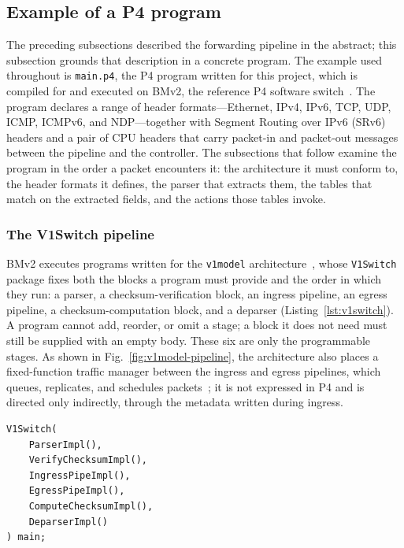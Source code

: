 \subsection{Example of a P4 program}
The preceding subsections described the forwarding pipeline in the abstract; this subsection grounds that description in a concrete program. The example used throughout is \texttt{main.p4}, the P4 program written for this project, which is compiled for and executed on BMv2, the reference P4 software switch~\cite{bmv2}. The program declares a range of header formats---Ethernet, IPv4, IPv6, TCP, UDP, ICMP, ICMPv6, and NDP---together with Segment Routing over IPv6 (SRv6) headers and a pair of CPU headers that carry packet-in and packet-out messages between the pipeline and the controller. The subsections that follow examine the program in the order a packet encounters it: the architecture it must conform to, the header formats it defines, the parser that extracts them, the tables that match on the extracted fields, and the actions those tables invoke.

\subsubsection{The V1Switch pipeline}
BMv2 executes programs written for the \texttt{v1model} architecture~\cite{bmv2}, whose \texttt{V1Switch} package fixes both the blocks a program must provide and the order in which they run: a parser, a checksum-verification block, an ingress pipeline, an egress pipeline, a checksum-computation block, and a deparser (Listing~\ref{lst:v1switch}). A program cannot add, reorder, or omit a stage; a block it does not need must still be supplied with an empty body. These six are only the programmable stages. As shown in Fig.~\ref{fig:v1model-pipeline}, the architecture also places a fixed-function traffic manager between the ingress and egress pipelines, which queues, replicates, and schedules packets~\cite{systemsapproach}; it is not expressed in P4 and is directed only indirectly, through the metadata written during ingress.



\begin{lstlisting}[caption={Instantiating the \texttt{V1Switch} pipeline in \texttt{main.p4}.},label={lst:v1switch}]
V1Switch(
    ParserImpl(),
    VerifyChecksumImpl(),
    IngressPipeImpl(),
    EgressPipeImpl(),
    ComputeChecksumImpl(),
    DeparserImpl()
) main;
\end{lstlisting}

